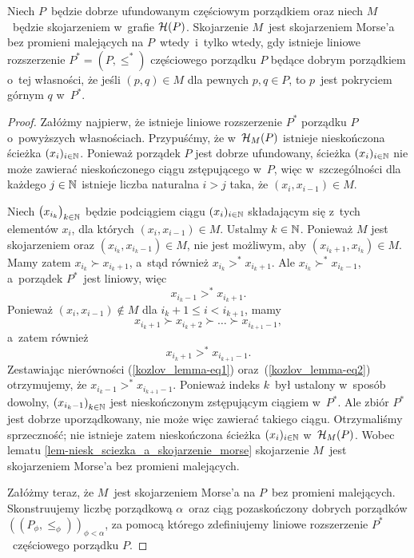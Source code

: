 \begin{lem}\label{lem-kozlov_lemma}
Niech $P$~będzie dobrze ufundowanym częściowym porządkiem oraz
niech $M$~będzie skojarzeniem w~grafie $\mathcal{H}(P)$. Skojarzenie $M$~jest skojarzeniem Morse'a bez promieni malejących na $P$~wtedy~i~tylko wtedy, gdy istnieje liniowe rozszerzenie \mbox{$P^*=(P,\leq^*)$} częściowego porządku $P$ będące dobrym porządkiem o~tej własności, że jeśli $(p,q)\in M$ dla pewnych $p,q\in P$, to $p$~jest pokryciem górnym $q$ w~$P^*$.
\end{lem}
\begin{proof}
Załóżmy najpierw, że istnieje liniowe rozszerzenie $P^*$ porządku $P$ o~powyższych własnościach. Przypuśćmy, że w~$\mathcal{H}_M(P)$ istnieje nieskończona ścieżka $(x_i)_{i\in\mathbb{N}}$. Ponieważ porządek $P$ jest dobrze ufundowany, ścieżka $(x_i)_{i\in\mathbb{N}}$ nie może zawierać nieskończonego ciągu zstępującego w~$P$, więc w~szczególności dla każdego $j\in\mathbb{N}$ istnieje liczba naturalna $i>j$ taka, że $(x_{i},x_{i-1})\in M$.

Niech $\bigl(x_{i_k}\bigr)_{k\in\mathbb{N}}$ będzie podciągiem ciągu $(x_i)_{i\in\mathbb{N}}$ składającym się z~tych elementów $x_i$, dla których $(x_{i},x_{i-1})\in M$. Ustalmy $k\in\mathbb{N}$. Ponieważ $M$ jest skojarzeniem oraz $\left(x_{i_k},x_{i_k-1}\right)\in M$, nie jest możliwym, aby $\left(x_{i_k+1},x_{i_k}\right)\in M$. Mamy zatem $x_{i_k}\succ x_{i_k+1}$, a~stąd również $x_{i_k}>^* x_{i_k+1}$. Ale $x_{i_k}\succ^* x_{i_k-1}$, a~porządek $P^*$~jest liniowy, więc \begin{equation}x_{i_k-1}>^*x_{i_k+1}.\label{kozlov_lemma-eq1}\end{equation} Ponieważ $(x_i,x_{i-1})\not\in M$ dla $i_k+1\leq i<i_{k+1}$, mamy \[x_{i_k+1}\succ x_{i_k+2}\succ\ldots \succ x_{i_{k+1}-1},\] a~zatem również \begin{equation}x_{i_k+1}>^*x_{i_{k+1}-1}.\label{kozlov_lemma-eq2}\end{equation} Zestawiając nierówności (\ref{kozlov_lemma-eq1}) oraz~(\ref{kozlov_lemma-eq2}) otrzymujemy, że $x_{i_k-1}>^*x_{i_{k+1}-1}$. Ponieważ indeks $k$~był ustalony w~sposób dowolny, $\left(x_{i_k-1}\right)_{k\in\mathbb{N}}$ jest nieskończonym  zstępującym ciągiem w~$P^*$. Ale zbiór $P^*$ jest dobrze uporządkowany, nie może więc zawierać takiego ciągu. Otrzymaliśmy sprzeczność; nie istnieje zatem nieskończona ścieżka $(x_i)_{i\in\mathbb{N}}$ w~$\mathcal{H}_M(P)$. Wobec lematu \ref{lem-niesk_sciezka_a_skojarzenie_morse} skojarzenie $M$~jest skojarzeniem Morse'a bez promieni malejących.

Załóżmy teraz, że $M$~jest skojarzeniem Morse'a na $P$~bez promieni malejących. Skonstruujemy liczbę porządkową $\alpha$~oraz ciąg pozaskończony dobrych porządków $\left(\left(P_\phi, \leq_\phi\right)\right)_{\phi<\alpha}$, za pomocą którego zdefiniujemy liniowe rozszerzenie $P^*$~częściowego porządku $P$. 


\end{proof}
